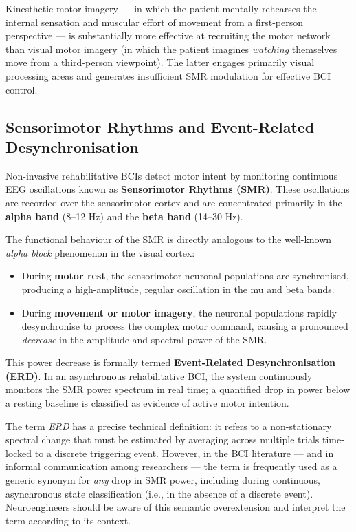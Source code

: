 \documentclass[10pt, letterpaper]{report}
\begin{document}
\begin{boxobservation}{}{}
Kinesthetic motor imagery — in which the patient mentally rehearses the internal
sensation and muscular effort of movement from a first-person perspective — is
substantially more effective at recruiting the motor network than visual motor imagery (in
which the patient imagines \emph{watching} themselves move from a third-person
viewpoint). The latter engages primarily visual processing areas and generates insufficient
SMR modulation for effective BCI control.
\end{boxobservation}

\subsection{Sensorimotor Rhythms and Event-Related Desynchronisation}

Non-invasive rehabilitative BCIs detect motor intent by monitoring continuous EEG
oscillations known as \textbf{Sensorimotor Rhythms (SMR)}. These oscillations are
recorded over the sensorimotor cortex and are concentrated primarily in the \textbf{alpha band} (8--12 Hz) and the \textbf{beta band} (14--30 Hz).

The functional behaviour of the SMR is directly analogous to the well-known \emph{alpha
block} phenomenon in the visual cortex:
\begin{itemize}
  \item During \textbf{motor rest}, the sensorimotor neuronal populations are
  synchronised, producing a high-amplitude, regular oscillation in the mu and beta bands.
  \item During \textbf{movement or motor imagery}, the neuronal populations rapidly
  desynchronise to process the complex motor command, causing a pronounced
  \emph{decrease} in the amplitude and spectral power of the SMR.
\end{itemize}

This power decrease is formally termed \textbf{Event-Related Desynchronisation (ERD)}.
In an asynchronous rehabilitative BCI, the system continuously monitors the SMR power
spectrum in real time; a quantified drop in power below a resting baseline is classified as
evidence of active motor intention.

\begin{boxobservation}{}{}
The term \emph{ERD} has a precise technical definition: it refers to a non-stationary
spectral change that must be estimated by averaging across multiple trials time-locked to
a discrete triggering event. However, in the BCI literature — and in informal communication
among researchers — the term is frequently used as a generic synonym for \emph{any}
drop in SMR power, including during continuous, asynchronous state classification (i.e.,
in the absence of a discrete event).  Neuroengineers should be aware of this
semantic overextension and interpret the term according to its context.
\end{boxobservation}
\end{document}
